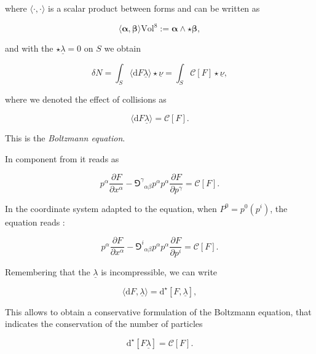 where $\langle\cdot,\cdot\rangle$ is a scalar product between forms and can be written as

\begin{equation}
\langle\boldsymbol{\alpha},\boldsymbol{\beta}\rangle\text{Vol}^8 := \boldsymbol{\alpha}\wedge\star\boldsymbol{\beta},
\end{equation}

and with the $\star\underline{\lambda}=0$ on $S$ we obtain 

\begin{equation}
\delta N = \int_S\langle\text{d}F\underline{\lambda}\rangle\star\underline{\nu} = \int_S\mathcal{C}[F]\star\underline{\nu},
\end{equation}

where we denoted the effect of collisions as

\begin{equation}
\langle\text{d}F\underline{\lambda}\rangle = \mathcal{C}[F].
\end{equation}

This is the \textit{Boltzmann equation}. 

In component from it reads as 

\begin{equation}
p^{\alpha}\frac{\partial F}{\partial x^{\alpha}} - {\Game^{\gamma}}_{\alpha\beta}p^{\alpha}p^{\alpha}\frac{\partial F}{\partial p^{\gamma}} =\mathcal{C}[F].
\end{equation}

In the coordinate system adapted to the equation, when $P^0 = p^0(p^i)$, the equation reads \cite{Cercignani:2002}:

\begin{equation}
p^{\alpha}\frac{\partial F}{\partial x^{\alpha}} - {\Game^{i}}_{\alpha\beta}p^{\alpha}p^{\alpha}\frac{\partial F}{\partial p^{i}} =\mathcal{C}[F].
\end{equation}

Remembering that the $\underline{\lambda}$ is incompressible, we can write

\begin{equation}
\langle\text{d}F,\underline{\lambda}\rangle = \text{d}^{\star}[F,\underline{\lambda}],
\end{equation}

This allows to obtain a conservative formulation of the Boltzmann equation, that indicates the conservation of the number of particles \cite{Cardall:2002bp}

\begin{equation}
\text{d}^{\star}[F\underline{\lambda}] = \mathcal{C}[F].
\end{equation}

